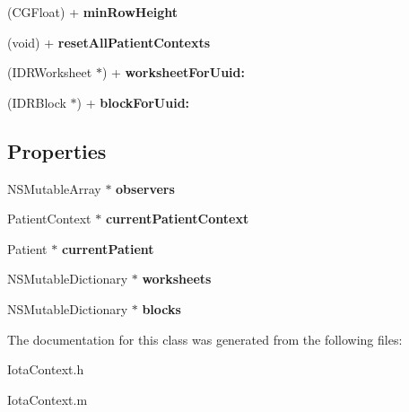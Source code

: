 \begin{DoxyCompactItemize}
\item 
\hypertarget{interface_iota_context_aa885191f812dd455dfb7565a63fc363d}{
(CGFloat) + {\bfseries minRowHeight}}
\label{interface_iota_context_aa885191f812dd455dfb7565a63fc363d}

\item 
\hypertarget{interface_iota_context_a76f7acf9eaa0e985b0311a381c89c473}{
(void) + {\bfseries resetAllPatientContexts}}
\label{interface_iota_context_a76f7acf9eaa0e985b0311a381c89c473}

\item 
\hypertarget{interface_iota_context_afc91c8cac311b420d3ce1af349186227}{
(IDRWorksheet $\ast$) + {\bfseries worksheetForUuid:}}
\label{interface_iota_context_afc91c8cac311b420d3ce1af349186227}

\item 
\hypertarget{interface_iota_context_aa43e2926c00bfbbfe55c4a552a9087c8}{
(IDRBlock $\ast$) + {\bfseries blockForUuid:}}
\label{interface_iota_context_aa43e2926c00bfbbfe55c4a552a9087c8}

\end{DoxyCompactItemize}
\subsection*{Properties}
\begin{DoxyCompactItemize}
\item 
\hypertarget{interface_iota_context_a0753cf726c150fa15d8354764cb64d6d}{
NSMutableArray $\ast$ {\bfseries observers}}
\label{interface_iota_context_a0753cf726c150fa15d8354764cb64d6d}

\item 
\hypertarget{interface_iota_context_ac9e2fa93dc8e7fe0ca92989c7d829fc0}{
PatientContext $\ast$ {\bfseries currentPatientContext}}
\label{interface_iota_context_ac9e2fa93dc8e7fe0ca92989c7d829fc0}

\item 
\hypertarget{interface_iota_context_ab32cc9082a9f423d95c212e4e9914b60}{
Patient $\ast$ {\bfseries currentPatient}}
\label{interface_iota_context_ab32cc9082a9f423d95c212e4e9914b60}

\item 
\hypertarget{interface_iota_context_aad6930e015af8e85f6edcec0c797a7a8}{
NSMutableDictionary $\ast$ {\bfseries worksheets}}
\label{interface_iota_context_aad6930e015af8e85f6edcec0c797a7a8}

\item 
\hypertarget{interface_iota_context_a8f8bfb5e6cf6ee5ef43decedcec86ae8}{
NSMutableDictionary $\ast$ {\bfseries blocks}}
\label{interface_iota_context_a8f8bfb5e6cf6ee5ef43decedcec86ae8}

\end{DoxyCompactItemize}


The documentation for this class was generated from the following files:\begin{DoxyCompactItemize}
\item 
IotaContext.h\item 
IotaContext.m\end{DoxyCompactItemize}

